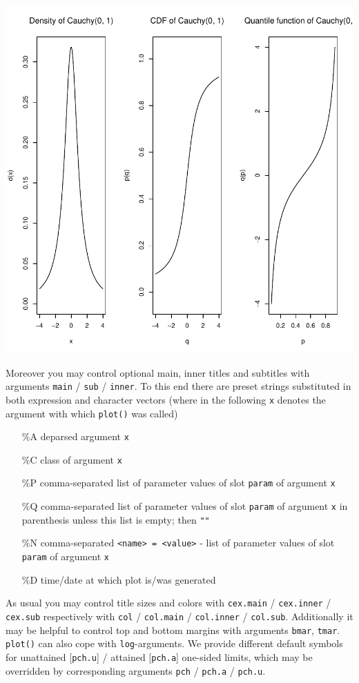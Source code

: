 \documentclass[11pt]{article}
\newcommand{\code}[1]{{\tt #1}}
\begin{document}
\includegraphics{distr-cauchy2}

Moreover you may control optional main, inner titles and subtitles with 
arguments \code{main} / \code{sub} / \code{inner}. To this end there are 
preset strings substituted in both expression and character vectors 
(where in the following \code{x} denotes the argument 
with which \code{plot()} was called)
\begin{itemize}
 \item[\%A] deparsed argument \code{x}
 \item[\%C] class of argument \code{x}
 \item[\%P] comma-separated list of parameter values of slot \code{param} of 
            argument \code{x}
 \item[\%Q] comma-separated list of parameter values of slot \code{param} of 
            argument \code{x} in parenthesis unless this list is empty; then 
            \code{""}
 \item[\%N] comma-separated {\tt <name> = <value>} - list of parameter values of 
            slot \code{param} of argument \code{x}
 \item[\%D] time/date at which plot is/was generated
\end{itemize}
As usual you may control title sizes and colors with 
\code{cex.main} / \code{cex.inner} / \code{cex.sub} respectively with
\code{col} / \code{col.main} / \code{col.inner} / \code{col.sub}. Additionally
it may be helpful to control top and bottom margins with arguments
\code{bmar}, \code{tmar}. \code{plot()} can also cope with \code{log}-arguments.
We provide different default symbols for unattained [\code{pch.u}] / attained 
[\code{pch.a}] one-sided limits, which may be overridden by corresponding
arguments  \code{pch} / \code{pch.a} / \code{pch.u}.
\end{document}
